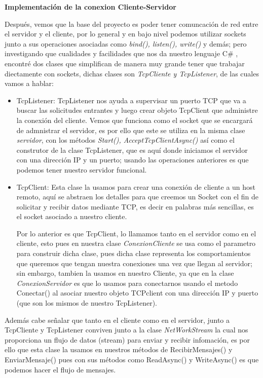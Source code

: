 \documentclass[10pt,letterpaper]{report}
\begin{document}
    \vspace{0.2cm}

        \noindent \textbf{Implementación de la conexion Cliente-Servidor}

    \noindent Después, vemos que la base del proyecto es poder tener comuncación de red entre el servidor y el cliente, por lo general y en bajo nivel podemos utilizar sockets junto a sus operaciones asociadas como \textit{bind(), listen(), write()} y demás; pero investigando que cualidades y facilidades que nos da nuestro lenguaje C\# , encontré dos clases que simplifican de manera muy grande tener que trabajar diectamente con sockets, dichas clases son \textit{TcpCliente y TcpListener},  de las cuales vamos a hablar:
    \begin{itemize}
        \item[-] {TcpListener:} TcpListener nos ayuda a supervisar un puerto TCP que va a buscar las solicitudes entrantes y luego crear objeto TcpClient que administre la conexión del  cliente. Vemos que funciona como el socket que se encargará de admnistrar el servidor, es por ello que este se utiliza en la misma clase \textit{servidor}, con los métodos \textit{Start(), AcceptTcpClientAsync()} así como el construtor de la clase TcpListener, que es aquí donde iniciamos el servidor con una dirección IP y un puerto; usando las operaciones anteriores es que podemos tener nuestro servidor funcional.
        \item[-] {TcpClient:} Esta clase la usamos para crear una conexión de cliente a un host remoto, aquí se abstraen los detalles para que creemos un Socket con el fin de solicitar y recibir datos mediante TCP, es decir en palabras más sencillas, es el socket asociado a nuestro cliente.

        Por lo anterior es que TcpClient, lo llamamos tanto en el servidor como en el cliente, esto pues en nuestra clase \textit{ConexionCliente} se usa como el parametro para construir dicha clase, pues dicha clase representa los comportamientos que queremos que tengan nuestra conexiones una vez que llegan al servidor; sin embargo, tambien la usamos en nuestro Cliente, ya que en la clase \textit{ConexionServidor} es que lo usamos para conectarnos usando el metodo Conectar() al asociar nuestro objeto TCPclient con una dirección IP y puerto  (que son los mismos de nuestro TcpListener).
    \end{itemize}

    \noindent Además cabe señalar que tanto en el cliente como en el servidor, junto a TcpCliente y TcpListener conviven junto a la clase \textit{NetWorkStream} la cual nos proporciona un flujo de datos (stream) para enviar y recibir infomación, es por ello que esta clase la usamos en nuestros métodos de RecibirMensajes() y EnviarMensaje() pues con sus métodos como ReadAsync() y WriteAsync() es que podemos hacer el flujo de mensajes.
\end{document}
